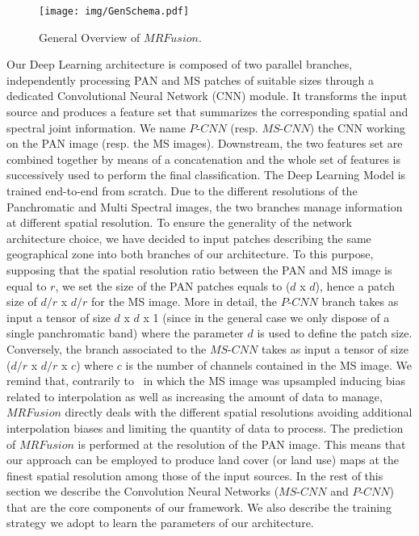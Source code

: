 \documentclass[journal]{IEEEtran}
\newcommand{\method}{$MRFusion$}
\begin{document}
\begin{figure}[ht!]
\centering
\texttt{[image: img/GenSchema.pdf]}
\caption{ \label{fig:Overview} General Overview of \method. }
\end{figure}

Our Deep Learning architecture is composed of two parallel branches, independently processing PAN and MS patches of suitable sizes through a dedicated Convolutional Neural Network (CNN) module. It transforms the input source and produces a feature set that summarizes the corresponding spatial and spectral joint information. We name $P$-$CNN$ (resp. $MS$-$CNN$) the CNN working on the PAN image (resp. the MS images).
Downstream, the two features set are combined together by means of a concatenation and the whole set of features is successively used to perform the final classification. The Deep Learning Model is trained end-to-end from scratch.
Due to the different resolutions of the Panchromatic and Multi Spectral images, the two branches manage information at different spatial resolution. To ensure the generality of the network architecture choice, we have decided to input patches describing the same geographical zone into both branches of our architecture.
To this purpose, supposing that the spatial resolution ratio between the PAN and MS image is equal to $r$, we set the size of the PAN patches equals to ($d$ x $d$), hence a patch size of $d/r$ x $d/r$ for the MS image. More in detail, the $P$-$CNN$ branch takes as input a tensor of size $d$ x $d$ x 1 (since in the general case we only dispose of a single panchromatic band) where the parameter $d$ is used to define the patch size. Conversely, the branch associated to the $MS$-$CNN$ takes as input a tensor of size ($d/r$ x $d/r$ x $c$) where $c$ is the number of channels contained in the MS image.
We remind that, contrarily to~\cite{LiuJZZZLYT18} in which the MS image was upsampled inducing bias related to interpolation as well as increasing the amount of data to manage, \method{} directly deals with the different spatial resolutions avoiding additional interpolation biases and limiting the quantity of data to process. The prediction of \method{} is performed at the resolution of the PAN image. This means that our approach can be employed to produce land cover (or land use) maps at the finest spatial resolution among those of the input sources.
In the rest of this section we describe the Convolution Neural Networks ($MS$-$CNN$ and $P$-$CNN$) that are the core components of our framework. We also describe the training strategy we adopt to learn the parameters of our architecture. 
\end{document}
